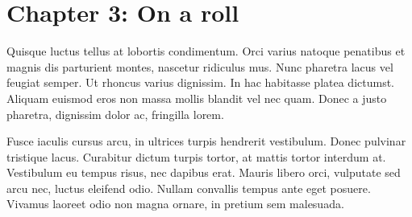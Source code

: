 \section{Chapter 3: On a roll}

Quisque luctus tellus at lobortis condimentum. Orci varius natoque penatibus et magnis dis parturient montes, nascetur ridiculus mus. Nunc pharetra lacus vel feugiat semper. Ut rhoncus varius dignissim. In hac habitasse platea dictumst. Aliquam euismod eros non massa mollis blandit vel nec quam. Donec a justo pharetra, dignissim dolor ac, fringilla lorem.

Fusce iaculis cursus arcu, in ultrices turpis hendrerit vestibulum. Donec pulvinar tristique lacus. Curabitur dictum turpis tortor, at mattis tortor interdum at. Vestibulum eu tempus risus, nec dapibus erat. Mauris libero orci, vulputate sed arcu nec, luctus eleifend odio. Nullam convallis tempus ante eget posuere. Vivamus laoreet odio non magna ornare, in pretium sem malesuada.
